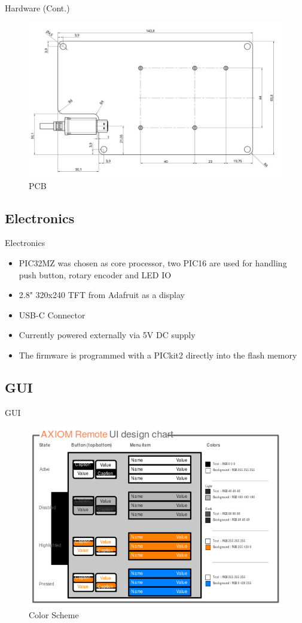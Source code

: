 \documentclass{beamer}
\begin{document}
\begin{frame}{Hardware (Cont.)}
	\begin{center}
		\begin{figure}[h]
		    \centering
		    \includegraphics[width=0.8\linewidth]{images/Axiom_Remote_PCB.jpg}
		    \caption{PCB}
		    \label{fig:logo}
		\end{figure}
	\end{center}
\end{frame}

\subsection{Electronics}

\begin{frame}{Electronics}
	\begin{itemize}
		\item PIC32MZ was chosen as core processor, two PIC16 are used for handling push button, rotary encoder and LED IO
		\item 2.8" 320x240 TFT from Adafruit as a display
		\item USB-C Connector
		\item Currently powered externally via 5V DC supply
		\item The firmware is programmed with a PICkit2 directly into the flash memory
	\end{itemize}
\end{frame}

\subsection{GUI}

\begin{frame}{GUI}
	\begin{center}
		\begin{figure}[h]
		    \centering
		    \includegraphics[width=0.8\linewidth]{images/AXIOM_Remote_UI_design_chart.png}
		    \caption{Color Scheme}
		    \label{fig:logo}
		\end{figure}
	\end{center}
\end{frame}
\end{document}
